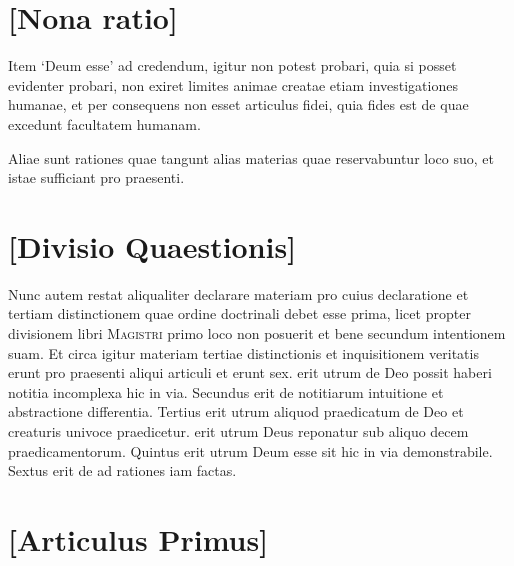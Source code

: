 \documentclass[twoside, openright]{report}
\newcommand{\name}[1]{\textsc{#1}}
\begin{document}
        \bigskip
         \section*{[Nona ratio]} 
        \pstart
        Item \enquote*{Deum esse}  ad credendum, igitur non potest probari, quia si posset evidenter probari, non exiret limites animae creatae  etiam investigationes humanae, et per consequens non esset articulus fidei, quia fides est de  quae excedunt facultatem humanam.
        \pend
      
        \bigskip
         
        \pstart
        Aliae sunt rationes quae tangunt alias materias quae reservabuntur loco suo, et istae sufficiant pro praesenti.
        \pend
       
        \bigskip
         \section*{[Divisio Quaestionis]} 
        \pstart
        Nunc autem restat aliqualiter declarare materiam pro cuius declaratione et   tertiam distinctionem quae ordine doctrinali debet esse prima, licet propter divisionem libri \name{Magistri} primo loco non posuerit et bene secundum intentionem suam. Et circa igitur materiam  tertiae distinctionis et inquisitionem veritatis erunt pro praesenti aliqui  articuli et erunt sex.  erit utrum de Deo possit haberi notitia incomplexa hic in via. Secundus erit de notitiarum intuitione et abstractione differentia. Tertius erit utrum aliquod praedicatum de Deo et creaturis univoce praedicetur.  erit utrum Deus reponatur sub aliquo decem praedicamentorum. Quintus  erit utrum Deum esse sit hic in via demonstrabile. Sextus erit de  ad rationes iam factas.
        \pend
      
        \bigskip
         \section*{[Articulus Primus]} 
        \bigskip
\end{document}
